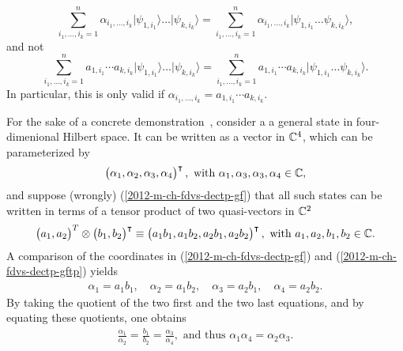\begin{equation}
\sum_{i_1,\ldots ,i_k=1}^n \alpha_{i_1,\ldots ,i_k} \vert \psi_{1,i_1} \rangle  \ldots    \vert \psi_{k,i_k}\rangle =
\sum_{i_1,\ldots ,i_k=1}^n \alpha_{i_1,\ldots ,i_k} \vert \psi_{1,i_1}   \ldots      \psi_{k,i_k}\rangle
,
\end{equation}
and not
\begin{equation}
\sum_{i_1,\ldots ,i_k=1}^n a_{1,i_1} \cdots a_{k,i_k} \vert \psi_{1,i_1} \rangle  \ldots    \vert \psi_{k,i_k}\rangle =
\sum_{i_1,\ldots ,i_k=1}^n a_{1,i_1} \cdots a_{k,i_k}  \vert \psi_{1,i_1}   \ldots      \psi_{k,i_k}\rangle .
\end{equation}
In particular, this is only valid if $\alpha_{i_1,\ldots ,i_k}  = a_{1,i_1} \cdots a_{k,i_k}$.



For the sake of a concrete demonstration~\cite[Section~1.5]{mermin-07},
consider a a general state in four-dimenional Hilbert space.
It can be written as a vector in ${\Bbb C}^4$, which can be parameterized by
\begin{equation}
\begin{pmatrix}\alpha_1,\alpha_2,\alpha_3,\alpha_4\end{pmatrix}^\intercal , \textrm{ with } \alpha_1,\alpha_3,\alpha_3,\alpha_4 \in {\Bbb C},
\label{2012-m-ch-fdvs-dectp-gf}
\end{equation}
and suppose (wrongly)  (\ref{2012-m-ch-fdvs-dectp-gf}) that all such states can be written in terms of a tensor product of two quasi-vectors in  ${\Bbb C}^2$
\begin{equation}
\begin{pmatrix}a_1,a_2\end{pmatrix}^T\otimes \begin{pmatrix}b_1,b_2\end{pmatrix}^\intercal
\equiv \begin{pmatrix}a_1b_1, a_1 b_2,a_2b_1,a_2b_2\end{pmatrix}^\intercal , \textrm{ with } a_1,a_2,b_1,b_2\in {\Bbb C}.
\label{2012-m-ch-fdvs-dectp-gftp}
\end{equation}
A comparison of the coordinates in
(\ref{2012-m-ch-fdvs-dectp-gf})
and
(\ref{2012-m-ch-fdvs-dectp-gftp})
yields
\begin{equation}
\begin{split}
\alpha_1=a_1b_1,\quad
\alpha_2=a_1b_2,\quad
\alpha_3=a_2b_1,\quad
\alpha_4=a_2b_2.
\end{split}
\label{2012-m-ch-fdvs-dectp-gftp-a}
\end{equation}
By taking the quotient of the two first and the two last equations, and by equating these quotients, one obtains
\begin{equation}
\begin{split}
\frac{\alpha_1}{\alpha_2}=\frac{b_1}{b_2}
=\frac{\alpha_3}{\alpha_4},\textrm{ and thus }
{\alpha_1}{\alpha_4}={\alpha_2}{\alpha_3}.
\end{split}
\label{2012-m-ch-fdvs-dectp-gftp-fr}
\end{equation}





